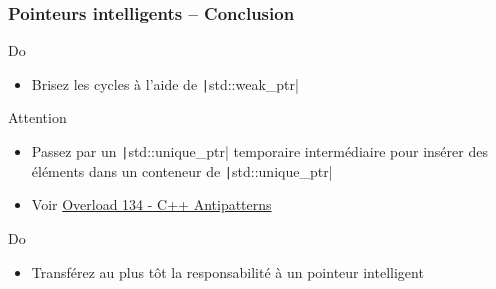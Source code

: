 \documentclass[C++.tex]{subfiles}
\begin{document}
\begin{frame}[fragile]
	\frametitle{Pointeurs intelligents -- Conclusion}
	\begin{exampleblock}{Do}
		\begin{itemize}
			\item Brisez les cycles à l'aide de \texttt|std::weak_ptr|
		\end{itemize}
	\end{exampleblock}

	\begin{alertblock}{Attention}
		\begin{itemize}
			\item Passez par un \texttt|std::unique_ptr| temporaire intermédiaire pour insérer des éléments dans un conteneur de \texttt|std::unique_ptr|
			\item Voir \href{https://accu.org/index.php/journals/2271}{Overload 134 - C++ Antipatterns}
		\end{itemize}

	\end{alertblock}

	\begin{exampleblock}{Do}
		\begin{itemize}
			\item Transférez au plus tôt la responsabilité à un pointeur intelligent
		\end{itemize}
	\end{exampleblock}
\end{frame}
\end{document}
